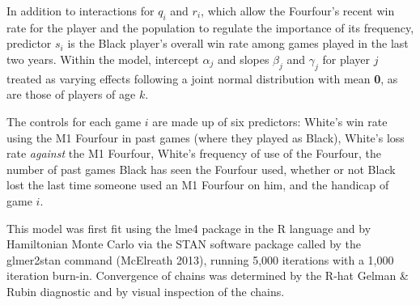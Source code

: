 \documentclass[reqno,12pt]{amsart}
\begin{document}
In addition to interactions for $q_i$ and $r_i$, which allow the Fourfour's recent win rate for the player and the population to regulate the importance of its frequency, predictor $s_i$ is the Black player's overall win rate among games played in the last two years. Within the model, intercept $\alpha_j$ and slopes $\beta_j$ and $\gamma_j$ for player $j$ treated as varying effects following a joint normal distribution with mean \textbf{0}, as are those of players of age $k$.

The controls for each game $i$ are made up of six predictors: White's win rate using the M1 Fourfour in past games (where they played as Black), White's loss rate \textit{against} the M1 Fourfour, White's frequency of use of the Fourfour, the number of past games Black has seen the Fourfour used, whether or not Black lost the last time someone used an M1 Fourfour on him, and the handicap of game $i$.

This model was first fit using the lme4 package in the R language and by Hamiltonian Monte Carlo via the STAN software package called by the glmer2stan command (McElreath 2013), running 5,000 iterations with a 1,000 iteration burn-in. Convergence of chains was determined by the R-hat Gelman & Rubin diagnostic \citep{stan2013stan} and by visual inspection of the chains.
\end{document}
